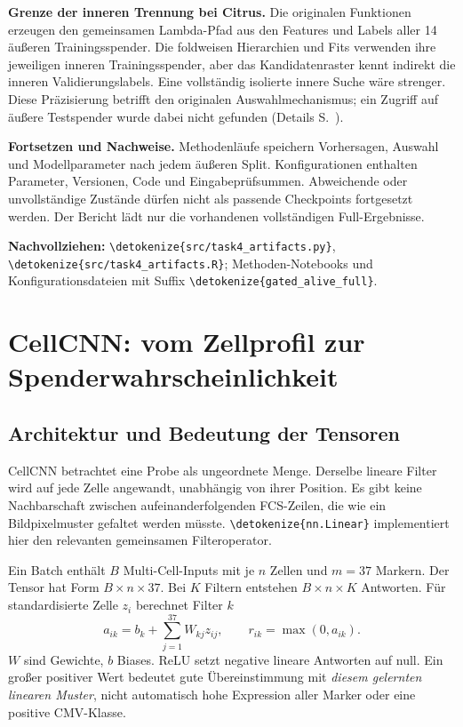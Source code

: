 \documentclass[11pt,a4paper]{article}
\newcommand{\code}[1]{\expandafter\nolinkurl\expandafter{\detokenize{#1}}}
\newcommand{\source}[1]{\par{\footnotesize\raggedright\color{muted}\textbf{Nachvollziehen:} #1\par}}
\begin{document}
\textbf{Grenze der inneren Trennung bei Citrus.} Die originalen Funktionen
erzeugen den gemeinsamen Lambda-Pfad aus den Features und Labels aller
14 äußeren Trainingsspender. Die foldweisen Hierarchien und Fits verwenden
ihre jeweiligen inneren Trainingsspender, aber das Kandidatenraster kennt
indirekt die inneren Validierungslabels. Eine vollständig isolierte innere
Suche wäre strenger. Diese Präzisierung betrifft den originalen
Auswahlmechanismus; ein Zugriff auf äußere Testspender wurde dabei nicht
gefunden (Details S.~\pageref{sec:citruslambda}).

\textbf{Fortsetzen und Nachweise.} Methodenläufe speichern Vorhersagen,
Auswahl und Modellparameter nach jedem äußeren Split. Konfigurationen
enthalten Parameter, Versionen, Code und Eingabeprüfsummen. Abweichende oder
unvollständige Zustände dürfen nicht als passende Checkpoints fortgesetzt
werden. Der Bericht lädt nur die vorhandenen vollständigen Full-Ergebnisse.
\source{\code{src/task4_artifacts.py}, \code{src/task4_artifacts.R};
Methoden-Notebooks und Konfigurationsdateien mit Suffix \code{gated_alive_full}.}

\clearpage
\section{CellCNN: vom Zellprofil zur Spenderwahrscheinlichkeit}\label{sec:cellcnn}
\subsection*{Architektur und Bedeutung der Tensoren}
CellCNN betrachtet eine Probe als ungeordnete Menge. Derselbe lineare
Filter wird auf jede Zelle angewandt, unabhängig von ihrer Position.
Es gibt keine Nachbarschaft zwischen aufeinanderfolgenden FCS-Zeilen,
die wie ein Bildpixelmuster gefaltet werden müsste. \code{nn.Linear}
implementiert hier den relevanten gemeinsamen Filteroperator.

Ein Batch enthält \(B\) Multi-Cell-Inputs mit je \(n\) Zellen und \(m=37\)
Markern. Der Tensor hat Form \(B\times n\times37\). Bei \(K\) Filtern
entstehen \(B\times n\times K\) Antworten. Für standardisierte Zelle
\(z_i\) berechnet Filter \(k\)
\[
 a_{ik}=b_k+\sum_{j=1}^{37}W_{kj}z_{ij},\qquad
 r_{ik}=\max(0,a_{ik}).
\]
\(W\) sind Gewichte, \(b\) Biases. ReLU setzt negative lineare Antworten
auf null. Ein großer positiver Wert bedeutet gute Übereinstimmung mit
\emph{diesem gelernten linearen Muster}, nicht automatisch hohe Expression
aller Marker oder eine positive CMV-Klasse.
\end{document}
